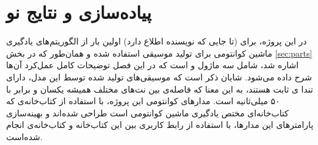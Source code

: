 \chapter{پیاده‌سازی و نتایج نو}

در این پروژه، برای (تا جایی که نویسنده اطلاع دارد) اولین بار از الگوریتم‌های یادگیری ماشین کوانتومی برای تولید موسیقی استفاده شده و همان‌طور که در بخش
\ref{sec:parts}
اشاره شد، شامل سه ماژول 
و
است که در این فصل توضیحات کامل عمل‌کرد آن‌ها شرح داده می‌شود.
شایان ذکر است که موسیقی‌های تولید شده توسط این مدل، دارای تندا
ی ثابت هستند، به این معنا که فاصله‌ی بین نت‌های مختلف همیشه یکسان و برابر با ۵۰ میلی‌ثانیه است.
مدارهای کوانتومی این پروژه، با استفاده از کتاب‌خانه‌ی 
که کتاب‌خانه‌ای مختص یادگیری ماشین کوانتومی است طراحی شده‌اند و بهینه‌سازی پارامترهای این مدارها، با استفاده از رابط کاربری بین این کتاب‌خانه و کتاب‌خانه‌ی
انجام شده‌است.



